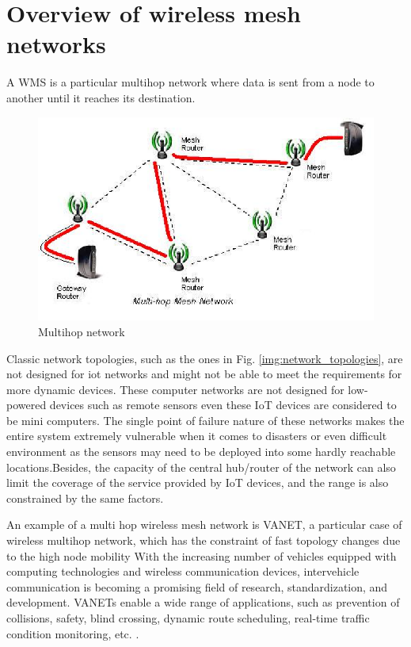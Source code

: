 	\section{Overview of wireless mesh networks}
	
		A WMS is a particular multihop network where data is sent from a node to another until it reaches its destination.
		
		\begin{figure}[H]
			\centering
			\includegraphics[width=.7\textwidth]{resources/img/chap4/mesh}
			\caption{Multihop network}
			\label{img:mesh}
		\end{figure}
		
		Classic network topologies, such as the ones in Fig. \ref{img:network_topologies}, are not designed for iot networks and might not be able to meet the requirements for more dynamic devices.		
		These computer networks are not designed for low-powered devices such as remote sensors even these IoT devices are considered to be mini computers.
		The single point of failure nature of these networks makes the entire system extremely vulnerable when it comes to disasters or even difficult environment as the sensors may need to be deployed into some hardly reachable locations.Besides, the capacity of the central hub/router of the network can also limit the coverage of the service provided by IoT devices, and the range is also constrained by the same factors.
		
		An example of a multi hop wireless mesh network is VANET, a particular case of wireless multihop network, which has the constraint of fast topology changes due to the high node mobility With the increasing number of vehicles equipped with computing technologies and wireless communication devices, intervehicle communication is becoming a promising field of research, standardization, and development. VANETs enable a wide range of applications, such as prevention of collisions, safety, blind crossing, dynamic route scheduling, real-time traffic condition monitoring, etc. \cite{BADIS2015653}.
		
